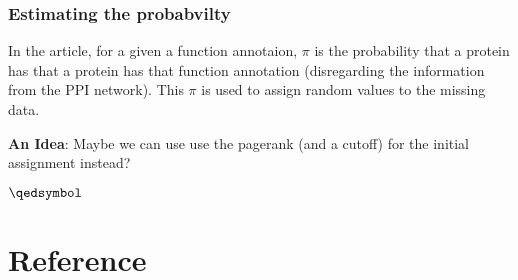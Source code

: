 \documentclass[a4paper,10pt]{article}
\theoremstyle{definition}
\theoremstyle{remark}
\theoremstyle{plain}
\begin{document}
\subsubsection{Estimating the probabvilty}
In the article, for a given a function annotaion, 
$\pi$ is the probability that a protein has that  
a protein has that function annotation (disregarding the information
from the PPI network). This $\pi$ is used to assign random values to the missing
data.

\textbf{An Idea}: Maybe we can use use the pagerank (and a cutoff) for the
initial assignment instead?

$\qedsymbol$


%


\nocite{herstein_winter_1989}
\nocite{meyer2000matrix}
\nocite{lawler2010random}
\nocite{girvan2002community}
\nocite{newman2006modularity}

\begin{comment}
\section{Tests}
\nocite{herstein_winter_1989}
\nocite{goodfellow2016deep}
\nocite{meyer2000matrix}


%
%
%

\end{comment}

\section{Reference}

%
% 
\printbibliography
\end{document}
